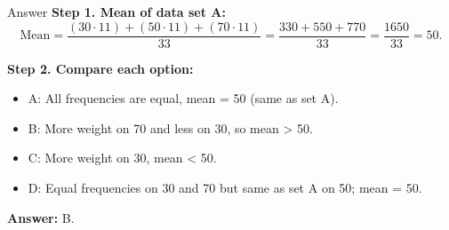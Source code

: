 \documentclass{beamer}
\begin{document}
\begin{frame}{Answer}
\textbf{Step 1. Mean of data set A:}
\[
\text{Mean} = \frac{(30 \cdot 11) + (50 \cdot 11) + (70 \cdot 11)}{33}
= \frac{330 + 550 + 770}{33}
= \frac{1650}{33}
= 50.
\]

\textbf{Step 2. Compare each option:}
\begin{itemize}
    \item A: All frequencies are equal, mean = 50 (same as set A).
    \item B: More weight on 70 and less on 30, so mean > 50.
    \item C: More weight on 30, mean < 50.
    \item D: Equal frequencies on 30 and 70 but same as set A on 50; mean = 50.
\end{itemize}

\textbf{Answer:} B.
\end{frame}
\end{document}
